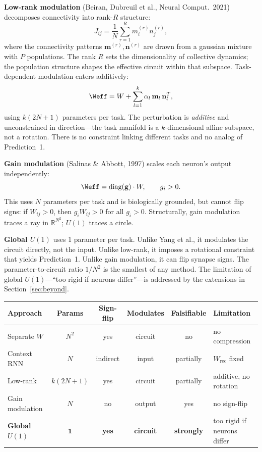 \documentclass[11pt]{article}
\begin{document}
\textbf{Low-rank modulation} (Beiran, Dubreuil et al., Neural Comput.\ 2021) decomposes connectivity into rank-$R$ structure:
\begin{equation}
J_{ij} = \frac{1}{N}\sum_{r=1}^{R} m_i^{(r)} n_j^{(r)},
\end{equation}
where the connectivity patterns $\mathbf{m}^{(r)}, \mathbf{n}^{(r)}$ are drawn from a gaussian mixture with $P$ populations. The rank $R$ sets the dimensionality of collective dynamics; the population structure shapes the effective circuit within that subspace. Task-dependent modulation enters additively:
\begin{equation}
\Weff = W + \sum_{l=1}^{k} \alpha_l\, \mathbf{m}_l\,\mathbf{n}_l^T,
\end{equation}
using $k(2N+1)$ parameters per task. The perturbation is \emph{additive} and unconstrained in direction---the task manifold is a $k$-dimensional affine subspace, not a rotation. There is no constraint linking different tasks and no analog of Prediction~1.

\textbf{Gain modulation} (Salinas \& Abbott, 1997) scales each neuron's output independently:
\begin{equation}
\Weff = \text{diag}(\mathbf{g})\cdot W, \qquad g_i > 0.
\end{equation}
This uses $N$ parameters per task and is biologically grounded, but cannot flip signs: if $W_{ij} > 0$, then $g_i W_{ij} > 0$ for all $g_i > 0$. Structurally, gain modulation traces a ray in $\mathbb{R}^{N^2}$; $U(1)$ traces a circle.

\textbf{Global $U(1)$} uses 1 parameter per task. Unlike Yang et al., it modulates the circuit directly, not the input. Unlike low-rank, it imposes a rotational constraint that yields Prediction~1. Unlike gain modulation, it can flip synapse signs. The parameter-to-circuit ratio $1/N^2$ is the smallest of any method. The limitation of global $U(1)$---``too rigid if neurons differ''---is addressed by the extensions in Section~\ref{sec:beyond}.

\begin{center}
\renewcommand{\arraystretch}{1.3}
\begin{tabular}{@{}lccccl@{}}
\toprule
\textbf{Approach} & \textbf{Params} & \textbf{Sign-flip} & \textbf{Modulates} & \textbf{Falsifiable} & \textbf{Limitation} \\
\midrule
Separate $W$ & $N^2$ & yes & circuit & no & no compression \\
Context RNN & $N$ & indirect & input & partially & $W_{\text{rec}}$ fixed \\
Low-rank & $k(2N{+}1)$ & yes & circuit & partially & additive, no rotation \\
Gain modulation & $N$ & no & output & yes & no sign-flip \\[3pt]
\textbf{Global $U(1)$} & $\mathbf{1}$ & \textbf{yes} & \textbf{circuit} & \textbf{strongly} & too rigid if neurons differ \\
\bottomrule
\end{tabular}
\end{center}
\end{document}
